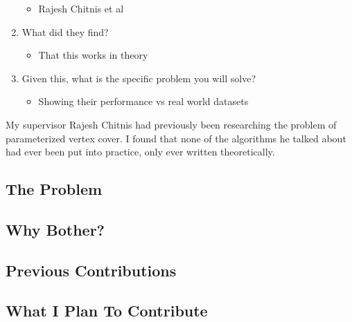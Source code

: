 \begin{enumerate}
    \begin{itemize}
        \item Rajesh Chitnis et al
    \end{itemize}
    \item What did they find?
    \begin{itemize}
        \item That this works in theory
    \end{itemize}
    \item Given this, what is the specific problem you will solve?
    \begin{itemize}
        \item Showing their performance vs real world datasets
    \end{itemize}
\end{enumerate}


My supervisor Rajesh Chitnis had previously been researching the problem of parameterized vertex cover. I found that none of the algorithms he talked about had ever been put into practice, only ever written theoretically.

\subsection{The Problem}
\subsection{Why Bother?}
\subsection{Previous Contributions}
\subsection{What I Plan To Contribute}
